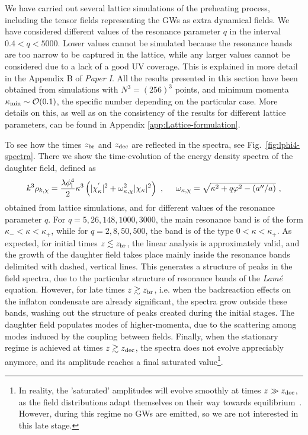\documentclass[a4paper,11pt]{article}
\newcommand{\be}{\begin{equation}}
\newcommand{\ee}{\end{equation}}
\begin{document}
We have carried out several lattice simulations of the preheating process, including the tensor fields representing the GWs as extra dynamical fields. We have considered different values of the resonance parameter $q$ in the interval $0.4 < q < 5000$. Lower values cannot be simulated because the resonance bands are too narrow to be captured in the lattice, while any larger values cannot be considered due to a lack of a good UV coverage. This is explained in more detail in the Appendix B of {\it Paper I}. All the results presented in this section have been obtained from simulations with $N^3 = (256)^3$ points, and minimum momenta $\kappa_{\rm min} \sim \mathcal{O} (0.1)$, the specific number depending on the particular case. More details on this, as well as on the consistency of the results for different lattice parameters, can be found in Appendix \ref{app:Lattice-formulation}.

To see how the times $z_{\rm br}$ and $z_{\rm dec}$ are reflected in the spectra, see Fig.~\ref{fig:lphi4-spectra}. There we show the time-evolution of the energy density spectra of the daughter field, defined as 
\be k^3 \rho_{k, \chi} = \frac{\lambda \phi_{\rm i}^4}{2} \kappa^3 \left(  | \chi^{'}_{\kappa} |^2  + \omega_{\kappa,\chi}^{2} | \chi_{\kappa} |^2 \right) \ , \hspace{0.5cm} \omega_{\kappa,\chi} = \sqrt{\kappa^2 + q \varphi^2 - (a''/a)} \label{eq:energy-density} \ ,\ee
obtained from lattice simulations, and for different values of the resonance parameter $q$. For $q=5,26,148,1000,3000$, the main resonance band is of the form $\kappa_- < \kappa < \kappa_+$, while for $q=2,8,50,500$, the band is of the type $0 < \kappa < \kappa_+$. As expected, for initial times $z \lesssim z_{\rm br}$, the linear analysis is approximately valid, and the growth of the daughter field takes place mainly inside the resonance bands delimited with dashed, vertical lines. This generates a structure of peaks in the field spectra, due to the particular structure of resonance bands of the {\it Lam\'e} equation. However, for late times $z \gtrsim z_{\rm br}$, i.e. when the backreaction effects on the inflaton condensate are already significant, the spectra grow outside these bands, washing out the structure of peaks created during the initial stages. The daughter field populates modes of higher-momenta, due to the scattering among modes induced by the coupling between fields. Finally, when the stationary regime is achieved at times $z \gtrsim z_ {\rm dec}$, the spectra does not evolve appreciably anymore, and its amplitude reaches a final saturated value\footnote{In reality, the 'saturated' amplitudes will evolve smoothly at times $z \gg z_{\rm dec}$, as the field distributions adapt themselves on their way towards equilibrium~\cite{Figueroa:2016wxr}. However, during this regime no GWs are emitted, so we are not interested in this late stage.}.
\end{document}
